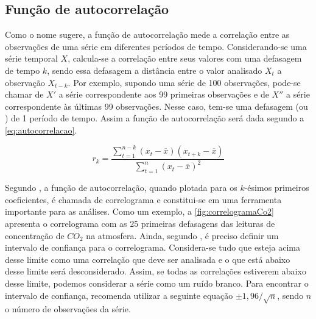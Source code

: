 \documentclass[
    12pt,
    oneside,
    a4paper,
    english,
    brazil
]{abntex2}
\begin{document}
\subsection{Função de autocorrelação}\label{sec:corre}


Como  o nome  sugere, a  função de  autocorrelação mede  a correlação  entre as
observações de uma  série em diferentes períodos de  tempo. Considerando-se uma
série  temporal  $X$,  calcula-se  a  correlação entre  seus  valores  com  uma
defasagem  de  tempo $k$,  sendo  essa  defasagem  a  distância entre  o  valor
analisado $X_t$ a  observação $X_{t-k}$. Por exemplo, supondo uma  série de 100
observações, pode-se  chamar de  $X'$ a série  correspondente aos  99 primeiras
observações e de $X''$ a série  correspondente às últimas 99 observações. Nesse
caso,  tem-se uma  defasagem (ou  ) de  1 período  de tempo.  Assim a
função de autocorrelação será dada segundo a \autoref{eq:autocorrelacao}.

\begin{equation}
    \label{eq:autocorrelacao}
    r_k = \frac{\sum_{t=1}^{n-k}{(x_t - \overline{x})(x_{t+k} -
    \overline{x})}}{\sum_{t=1}^{n}{(x_t - \overline{x})^2}}
\end{equation}


Segundo  ,  a  função   de  autocorrelação,  quando  plotada
para  os  $k$-ésimos  primeiros  coeficientes,  é  chamada  de  correlograma  e
constitui-se em uma ferramenta importante para  as análises. Como um exemplo, a
\autoref{fig:correlogramaCo2}  apresenta o  correlograma  com  as 25  primeiras
defasagens das leituras de concentração  de $CO_2$ na atmosfera. Ainda, segundo
,  é  preciso  definir  um intervalo  de  confiança  para  o
correlograma.
Considera-se tudo  que esteja acima desse  limite como uma correlação  que deve
ser analisada e  o que está abaixo desse limite  será desconsiderado. Assim, se
todas as correlações estiverem abaixo  desse limite, podemos considerar a série
como um ruído branco.
Para encontrar o intervalo de confiança,  recomenda utilizar
a seguinte equação  $\pm{}1,96/\sqrt{n}$, sendo $n$ o número  de observações da
série.
\end{document}
